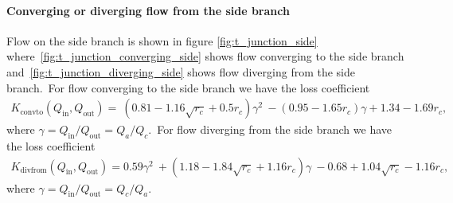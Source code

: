 \paragraph{Converging or diverging flow from the side branch}

Flow on the side branch is shown in figure \ref{fig:t_junction_side} where\ 
\ref{fig:t_junction_converging_side} shows flow converging to the side branch and\
\ref{fig:t_junction_diverging_side} shows flow diverging from the side branch.\
For flow converging to the side branch we have the loss coefficient 
\begin{align} \label{eq:K_conv_to_side}
    K_{\text{convto}}(Q_{\text{in}}, Q_{\text{out}}) = \  
    \left(0.81 - 1.16 \sqrt{r_c} + 0.5 r_c \right) \gamma^2 \ 
    - \left( 0.95 - 1.65 r_c \right) \gamma + 1.34 - 1.69 r_c,
\end{align}
where $\gamma = Q_{\text{in}} / Q_{\text{out}} = Q_a / Q_c$.\
For flow diverging from the side branch we have the loss coefficient 
\begin{align} \label{eq:K_div_from_side}
    K_{\text{divfrom}}(Q_{\text{in}}, Q_{\text{out}}) = 0.59 \gamma^2 \ 
    + \left( 1.18 - 1.84 \sqrt{r_c} + 1.16 r_c \right) \gamma \ 
    - 0.68 + 1.04 \sqrt{r_c} - 1.16 r_c,
\end{align}
where $\gamma = Q_{\text{in}} / Q_{\text{out}} = Q_c / Q_a$.


